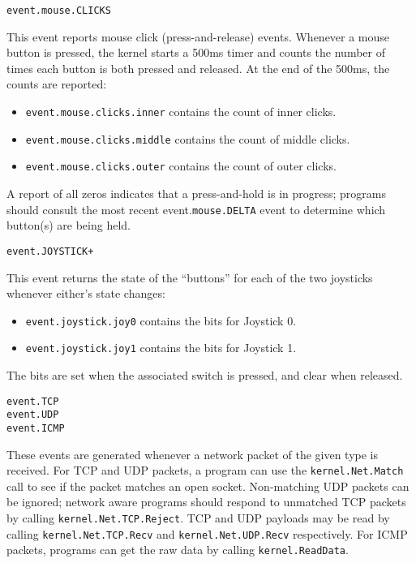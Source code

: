 \begin{verbatim}
event.mouse.CLICKS
\end{verbatim}

This event reports mouse click (press-and-release) events.  Whenever a mouse button is pressed, the kernel starts a 500ms timer and counts the number of times each button is both pressed and released.  At the end of the 500ms, the counts are reported:

\begin{itemize}
\item \verb+event.mouse.clicks.inner+ contains the count of inner clicks.
\item \verb+event.mouse.clicks.middle+ contains the count of middle clicks.
\item \verb+event.mouse.clicks.outer+ contains the count of outer clicks.
\end{itemize}

A report of all zeros indicates that a press-and-hold is in progress; programs should consult the most recent event.\verb+mouse.DELTA+ event to determine which button(s) are being held. 

\begin{verbatim}
event.JOYSTICK+
\end{verbatim}

This event returns the state of the ``buttons'' for each of the two joysticks whenever either's state changes:

\begin{itemize}
\item \verb+event.joystick.joy0+ contains the bits for Joystick 0.
\item \verb+event.joystick.joy1+ contains the bits for Joystick 1.
\end{itemize}

The bits are set when the associated switch is pressed, and clear when released.

\begin{verbatim}
event.TCP
event.UDP
event.ICMP
\end{verbatim}

These events are generated whenever a network packet of the given type is received.  For TCP and UDP packets, a program can use the \verb+kernel.Net.Match+ call to see if the packet matches an open socket.  Non-matching UDP packets can be ignored; network aware programs should respond to unmatched TCP packets by calling \verb+kernel.Net.TCP.Reject+. TCP and UDP payloads may be read by calling \verb+kernel.Net.TCP.Recv+ and \verb+kernel.Net.UDP.Recv+ respectively.  For ICMP packets, programs can get the raw data by calling \verb+kernel.ReadData+.   

